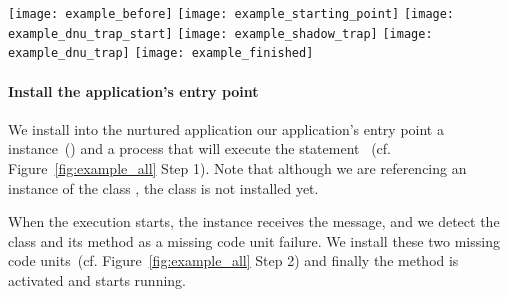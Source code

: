 \begin{figure*}[ht]
\begin{center}
\texttt{[image: example\_before]}
\texttt{[image: example\_starting\_point]}
\texttt{[image: example\_dnu\_trap\_start]}
\texttt{[image: example\_shadow\_trap]}
\texttt{[image: example\_dnu\_trap]}
\texttt{[image: example\_finished]}
\caption{\small\textbf{The nurtured application at different steps of tailoring.} \label{fig:example_all}}
\end{center}
\end{figure*}

\paragraph{Install the application's entry point} We install into the nurtured application our application's entry point \ie a  instance~() and a process that will execute the statement ~(cf. Figure~\ref{fig:example_all} Step 1). Note that although we are referencing an instance of the class , the  class is not installed yet.


When the execution starts, the  instance receives the  message, and we detect the  class and its  method as a missing code unit failure. We install these two missing code units~(cf. Figure~\ref{fig:example_all} Step 2) and finally the  method is activated and starts running.


